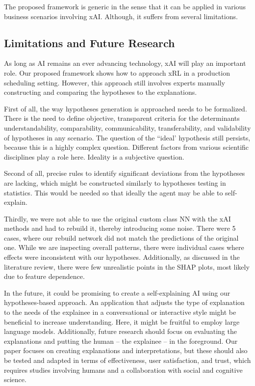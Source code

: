 The proposed framework is generic in the sense that it can be applied in various business scenarios involving xAI. Although, it suffers from several limitations.

\subsection{Limitations and Future Research}
As long as AI remains an ever advancing technology, xAI will play an important role. Our proposed framework shows how to approach xRL in a production scheduling setting.
However, this approach still involves experts manually constructing and comparing the hypotheses to the explanations.

First of all, the way hypotheses generation is approached needs to be formalized.
There is the need to define objective, transparent criteria for the determinants understandability, comparability, communicability, transferability, and validability of hypotheses in any scenario. The question of the ``ideal' hypothesis still persists, because this is a highly complex question. Different factors from various scientific disciplines play a role here. Ideality is a subjective question.

Second of all, precise rules to identify significant deviations from the hypotheses are lacking, which might be constructed similarly to hypotheses testing in statistics. This would be needed so that ideally the agent may be able to self-explain.

Thirdly, we were not able to use the original custom class NN with the xAI methods and had to rebuild it, thereby introducing some noise. There were 5 cases, where our rebuild network did not match the predictions of the original one.
While we are inspecting overall patterns, there were individual cases where effects were inconsistent with our hypotheses. Additionally, as discussed in the literature review, there were few unrealistic points in the SHAP plots, most likely due to feature dependence.

In the future, it could be promising to create a self-explaining AI using our hypotheses-based approach. An application that adjusts the type of explanation to the needs of the explainee in a conversational or interactive style might be beneficial to increase understanding. Here, it might be fruitful to employ large language models. Additionally, future research should focus on evaluating the explanations and putting the human – the explainee – in the foreground. Our paper focuses on creating explanations and interpretations, but these should also be tested and adapted in terms of effectiveness, user satisfaction, and trust, which requires studies involving humans and a collaboration with social and cognitive science. 

